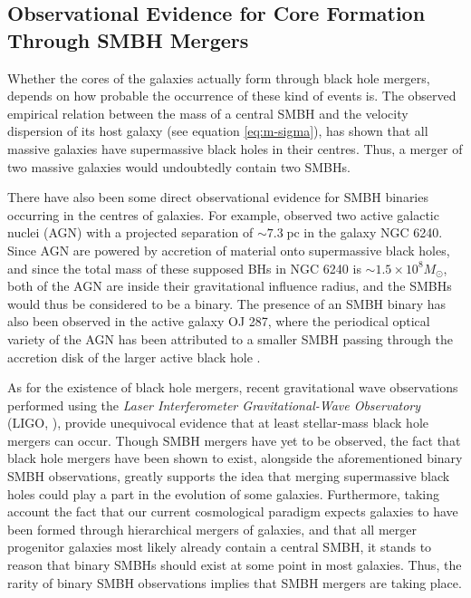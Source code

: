 \documentclass[english, twoside]{HYgradu}
\begin{document}
\subsection{Observational Evidence for Core Formation Through SMBH Mergers}

Whether the cores of the galaxies actually form through black hole mergers, depends on how probable the occurrence of these kind of events is. The observed empirical relation between the mass of a central SMBH and the velocity dispersion of its host galaxy (see equation \ref{eq:m-sigma}), has shown that all massive galaxies have supermassive black holes in their centres. Thus, a merger of two massive galaxies would undoubtedly contain two SMBHs. 

There have also been some direct observational evidence for SMBH binaries occurring in the centres of galaxies. For example, \cite{Rodriguez2006} observed two active galactic nuclei (AGN) with a projected separation of $\sim 7.3 \; \mathrm{pc}$ in the galaxy NGC 6240. Since AGN are powered by accretion of material onto supermassive black holes, and since the total mass of these supposed BHs in NGC 6240 is $\sim 1.5 \times 10^8 M_\odot$, both of the AGN are inside their gravitational influence radius, and the SMBHs would thus be considered to be a binary. The presence of an SMBH binary has also been observed in the active galaxy OJ 287, where the periodical optical variety of the AGN has been attributed to a smaller SMBH passing through the accretion disk of the larger active black hole \citep{MerrittBook}.

As for the existence of black hole mergers, recent gravitational wave observations performed using the \textit{Laser Interferometer Gravitational-Wave Observatory} (LIGO, \citealt{Abbott2016, Abbott2019}), provide unequivocal evidence that at least stellar-mass black hole mergers can occur. Though SMBH mergers have yet to be observed, the fact that black hole mergers have been shown to exist, alongside the aforementioned binary SMBH observations, greatly supports the idea that merging supermassive black holes could play a part in the evolution of some galaxies. Furthermore, taking account the fact that our current cosmological paradigm expects galaxies to have been formed through hierarchical mergers of galaxies, and that all merger progenitor galaxies most likely already contain a central SMBH, it stands to reason that binary SMBHs should exist at some point in most galaxies. Thus, the rarity of binary SMBH observations implies that SMBH mergers are taking place.
\end{document}

